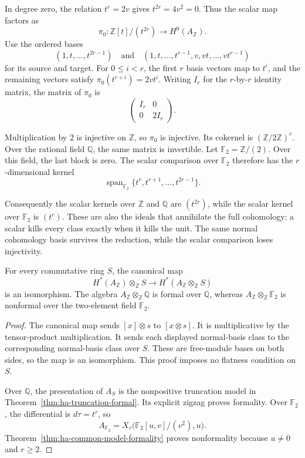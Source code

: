 In degree zero, the relation $t^r=2v$ gives $t^{2r}=4v^2=0$.
Thus the scalar map factors as
\[
 \pi_0:\mathbb Z[t]/(t^{2r})\longrightarrow H^0(A_{\mathbb Z}).
\]
Use the ordered bases
\[
 (1,t,\ldots,t^{2r-1})
 \quad\text{and}\quad
 (1,t,\ldots,t^{r-1},v,vt,\ldots,vt^{r-1})
\]
for its source and target.
For $0\leq i<r$, the first $r$ basis vectors map to $t^i$,
and the remaining vectors satisfy $\pi_0(t^{r+i})=2vt^i$.
Writing $I_r$ for the $r$-by-$r$ identity matrix, the matrix of $\pi_0$ is
\[
 \begin{pmatrix}I_r&0\\0&2I_r\end{pmatrix}.
\]

Multiplication by $2$ is injective on $\mathbb Z$, so $\pi_0$ is injective.
Its cokernel is $(\mathbb Z/2\mathbb Z)^r$.
Over the rational field $\mathbb Q$, the same matrix is invertible.
Let $\mathbb F_2=\mathbb Z/(2)$.
Over this field, the last block is zero.
The scalar comparison over $\mathbb F_2$ therefore has the
$r$-dimensional kernel
\[
 \operatorname{span}_{\mathbb F_2}
 \{t^r,t^{r+1},\ldots,t^{2r-1}\}.
\]

Consequently the scalar kernels over $\mathbb Z$ and $\mathbb Q$
are $(t^{2r})$, while the scalar kernel over $\mathbb F_2$ is $(t^r)$.
These are also the ideals that annihilate the full cohomology:
a scalar kills every class exactly when it kills the unit.
The same normal cohomology basis survives the reduction, while the
scalar comparison loses injectivity.

\begin{corollary}\label{cor:ha-formality-under-reduction}
For every commutative ring $S$, the canonical map
\[
 H^*(A_{\mathbb Z})\otimes_{\mathbb Z}S
 \longrightarrow H^*(A_{\mathbb Z}\otimes_{\mathbb Z}S)
\]
is an isomorphism.
The algebra $A_{\mathbb Z}\otimes_{\mathbb Z}\mathbb Q$ is formal
over $\mathbb Q$, whereas
$A_{\mathbb Z}\otimes_{\mathbb Z}\mathbb F_2$ is nonformal over
the two-element field $\mathbb F_2$.
\end{corollary}

\begin{proof}
The canonical map sends $[x]\otimes s$ to $[x\otimes s]$.
It is multiplicative by the tensor-product multiplication.
It sends each displayed normal-basis class to the corresponding
normal-basis class over $S$.
These are free-module bases on both sides, so the map is an isomorphism.
This proof imposes no flatness condition on $S$.

Over $\mathbb Q$, the presentation of $A_S$ is the nonpositive
truncation model in Theorem~\ref{thm:ha-truncation-formal}.
Its explicit zigzag proves formality.
Over $\mathbb F_2$, the differential is $d\tau=t^r$, so
\[
 A_{\mathbb F_2}
 =X_r\bigl(\mathbb F_2[u,v]/(v^2),u\bigr).
\]
Theorem~\ref{thm:ha-common-model-formality} proves nonformality because
$u\ne0$ and $r\geq2$.
\end{proof}

